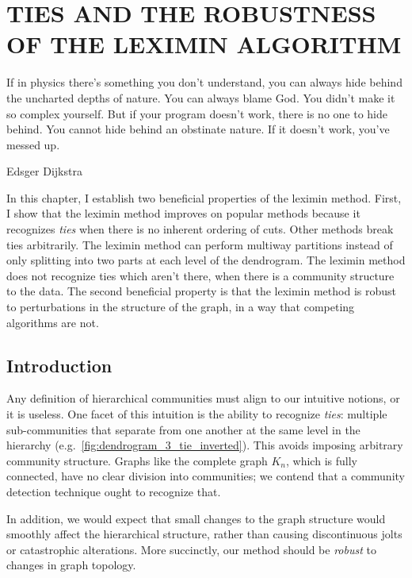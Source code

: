 \chapter{TIES AND THE ROBUSTNESS OF THE LEXIMIN ALGORITHM} \label{ch:robustness}%

\epigraph{If in physics there's something you don't understand, you can always hide behind the uncharted depths of nature. You can always blame God. You didn't make it so complex yourself. But if your program doesn't work, there is no one to hide behind. You cannot hide behind an obstinate nature. If it doesn't work, you've messed up.}{Edsger Dijkstra}

\noindent In this chapter, I establish two beneficial properties of the leximin method. First, I show that the leximin method improves on popular methods because it recognizes \emph{ties} when there is no inherent ordering of cuts. Other methods break ties arbitrarily. The leximin method can perform multiway partitions instead of only splitting into two parts at each level of the dendrogram. The leximin method does not recognize ties which aren't there, when there is a community structure to the data. The second beneficial property is that the leximin method is robust to perturbations in the structure of the graph, in a way that competing algorithms are not.





\section{Introduction}

Any definition of hierarchical communities must align to our intuitive notions, or it is useless. One facet of this intuition is the ability to recognize \emph{ties}: multiple sub-communities that separate from one another at the same level in the hierarchy (e.g.\ \autoref{fig:dendrogram_3_tie_inverted}). This avoids imposing arbitrary community structure. Graphs like the complete graph $K_n$, which is fully connected, have no clear division into communities; we contend that a community detection technique ought to recognize that.

In addition, we would expect that small changes to the graph structure would smoothly affect the hierarchical structure, rather than causing discontinuous jolts or catastrophic alterations. More succinctly, our method should be \emph{robust} to changes in graph topology.


